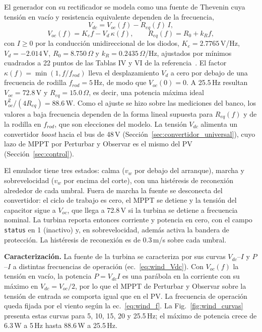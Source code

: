 \documentclass[conference]{IEEEtran}
\begin{document}
El generador con su rectificador se modela como una fuente de Thevenin cuya tensión en vacío y resistencia equivalente dependen de la frecuencia,
\begin{equation}
\label{eq:wind_Vdc}
V_{dc} = V_{oc}(f) - R_{eq}(f)\,I,
\end{equation}
\begin{equation}
\label{eq:wind_Voc}
V_{oc}(f) = K_e f - V_d\,\kappa(f), \qquad R_{eq}(f) = R_0 + k_R f,
\end{equation}
con $I\ge0$ por la conducción unidireccional de los diodos, $K_e=2.7765$\,V/Hz, $V_d=-2.014$\,V, $R_0=8.750\,\Omega$ y $k_R=0.2435\,\Omega$/Hz, ajustados por mínimos cuadrados a 22 puntos de las Tablas IV y VI de la referencia~\cite{gonzalez2026eolica}. El factor $\kappa(f)=\min(1,f/f_{rod})$ lleva el desplazamiento $V_d$ a cero por debajo de una frecuencia de rodilla $f_{rod}=5$\,Hz, de modo que $V_{oc}(0)=0$. 
A 25.5\,Hz resultan $V_{oc}=72.8$\,V y $R_{eq}=15.0\,\Omega$, es decir, una potencia máxima ideal $V_{oc}^2/(4R_{eq})=88.6$\,W. Como el ajuste se hizo sobre las mediciones del banco, los valores a baja frecuencia dependen de la forma lineal supuesta para $R_{eq}(f)$ y de la rodilla en $f_{rod}$, que son elecciones del modelo.
La tensión $V_{dc}$ alimenta un convertidor \emph{boost} hacia el bus de 48\,V (Sección~\ref{sec:convertidor_universal}), cuyo lazo de MPPT por Perturbar y Observar es el mismo del PV (Sección~\ref{sec:control}).

El emulador tiene tres estados: calma ($v_w$ por debajo del arranque), marcha y sobrevelocidad ($v_w$ por encima del corte), con una histéresis de reconexión alrededor de cada umbral. Fuera de marcha la fuente se desconecta del convertidor: el ciclo de trabajo es cero, el MPPT se detiene y la tensión del capacitor sigue a $V_{oc}$, que llega a 72.8\,V si la turbina se detiene a frecuencia nominal. La turbina reporta entonces corriente y potencia en cero, con el campo \texttt{status} en 1 (inactivo)
y, en sobrevelocidad, además activa la bandera de protección. La histéresis de reconexión es de 0.3\,m/s sobre cada umbral.

\textbf{Caracterización.} La fuente de la turbina se caracteriza por sus curvas $V_{dc}$--$I$ y $P$--$I$ a distintas frecuencias de operación (ec.~\eqref{eq:wind_Vdc}). Con $V_{oc}(f)$ la tensión en vacío, la potencia $P=V_{dc}I$ es una parábola en la corriente con su máximo en $V_{dc}=V_{oc}/2$, por lo que el MPPT de Perturbar y Observar sobre la tensión de entrada se comporta igual que en el PV. La frecuencia de operación queda fijada por el viento según la ec.~\eqref{eq:wind_f}. La Fig.~\ref{fig:wind_curvas} presenta estas curvas para 5, 10, 15, 20 y 25.5\,Hz; el máximo de potencia crece de 6.3\,W a 5\,Hz hasta 88.6\,W a 25.5\,Hz.
\end{document}
